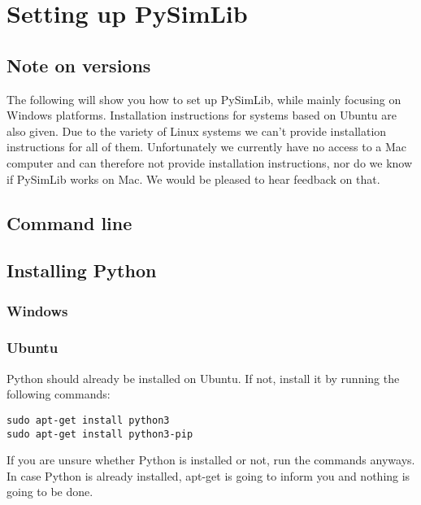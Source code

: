 \section{Setting up PySimLib}

\subsection{Note on versions}

The following will show you how to set up PySimLib, while mainly focusing on Windows platforms.
Installation instructions for systems based on Ubuntu are also given.
Due to the variety of Linux systems we can't provide installation instructions for all of them.
Unfortunately we currently have no access to a Mac computer and can therefore not provide installation instructions, nor do we know if PySimLib works on Mac.
We would be pleased to hear feedback on that.





\subsection{Command line}






\subsection{Installing Python}

\subsubsection{Windows}


\subsubsection{Ubuntu}
Python should already be installed on Ubuntu.
If not, install it by running the following commands:
\lstset{language=bash}
\begin{lstlisting}
sudo apt-get install python3
sudo apt-get install python3-pip
\end{lstlisting}
If you are unsure whether Python is installed or not, run the commands anyways.
In case Python is already installed, apt-get is going to inform you and nothing is going to be done.





